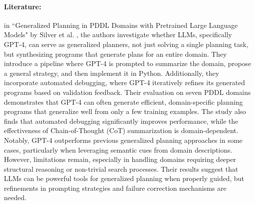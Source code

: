 \paragraph{Literature:}
in ``Generalized Planning in PDDL Domains with Pretrained Large Language Models"
by Silver et al. \cite{silver2023generalizedplanningpddldomains}, the authors investigate
whether LLMs, specifically GPT-4, can serve as generalized planners, not just
solving a single planning task, but synthesizing programs that generate plans for
an entire domain. They introduce a pipeline where GPT-4 is prompted to summarize
the domain, propose a general strategy, and then implement it in Python. Additionally,
they incorporate automated debugging, where GPT-4 iteratively refines its generated
programs based on validation feedback. Their evaluation on seven PDDL domains
demonstrates that GPT-4 can often generate efficient, domain-specific planning programs
that generalize well from only a few training examples. The study also finds
that automated debugging significantly improves performance, while the effectiveness
of Chain-of-Thought (CoT) summarization is domain-dependent. Notably, GPT-4 outperforms
previous generalized planning approaches in some cases, particularly when
leveraging semantic cues from domain descriptions. However, limitations remain, especially
in handling domains requiring deeper structural reasoning or non-trivial search processes.
Their results suggest that LLMs can be powerful tools for generalized planning
when properly guided, but refinements in prompting strategies and failure correction
mechanisms are needed.